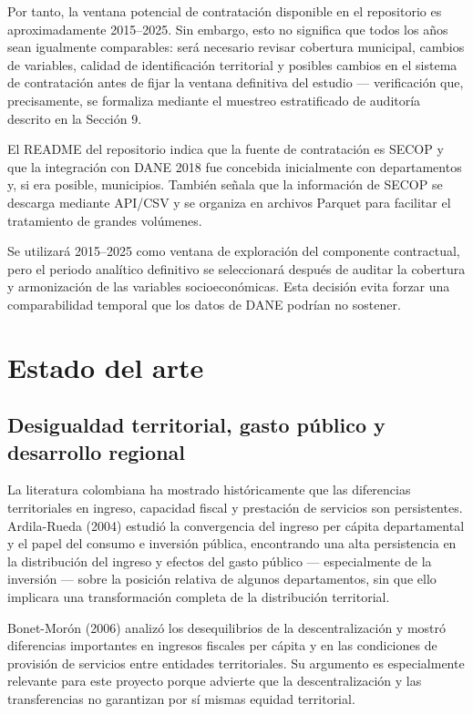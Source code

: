 \documentclass[11pt,letterpaper]{article}
\newenvironment{recuadro}[1]{%
  \begin{tcolorbox}[breakable,colback=boxbg,colframe=ustablue,boxrule=0.6pt,arc=1.5pt,
  title={\small\bfseries #1},fonttitle=\small,coltitle=white,colbacktitle=ustablue,
  left=6pt,right=6pt,top=4pt,bottom=4pt]
}{\end{tcolorbox}}
\begin{document}
Por tanto, la ventana potencial de contratación disponible en el repositorio es
aproximadamente 2015--2025. Sin embargo, esto no significa que todos los años
sean igualmente comparables: será necesario revisar cobertura municipal,
cambios de variables, calidad de identificación territorial y posibles cambios
en el sistema de contratación antes de fijar la ventana definitiva del
estudio --- verificación que, precisamente, se formaliza mediante el muestreo
estratificado de auditoría descrito en la Sección 9.

El README del repositorio indica que la fuente de contratación es SECOP y que
la integración con DANE 2018 fue concebida inicialmente con departamentos y, si
era posible, municipios. También señala que la información de SECOP se
descarga mediante API/CSV y se organiza en archivos Parquet para facilitar el
tratamiento de grandes volúmenes.

\begin{recuadro}{Decisión metodológica}
Se utilizará 2015--2025 como ventana de exploración del componente contractual,
pero el periodo analítico definitivo se seleccionará después de auditar la
cobertura y armonización de las variables socioeconómicas. Esta decisión evita
forzar una comparabilidad temporal que los datos de DANE podrían no sostener.
\end{recuadro}

\section{Estado del arte}

\subsection{Desigualdad territorial, gasto público y desarrollo regional}

La literatura colombiana ha mostrado históricamente que las diferencias
territoriales en ingreso, capacidad fiscal y prestación de servicios son
persistentes. Ardila-Rueda (2004) estudió la convergencia del ingreso per
cápita departamental y el papel del consumo e inversión pública, encontrando
una alta persistencia en la distribución del ingreso y efectos del gasto
público --- especialmente de la inversión --- sobre la posición relativa de
algunos departamentos, sin que ello implicara una transformación completa de
la distribución territorial.

Bonet-Morón (2006) analizó los desequilibrios de la descentralización y mostró
diferencias importantes en ingresos fiscales per cápita y en las condiciones de
provisión de servicios entre entidades territoriales. Su argumento es
especialmente relevante para este proyecto porque advierte que la
descentralización y las transferencias no garantizan por sí mismas equidad
territorial.
\end{document}
